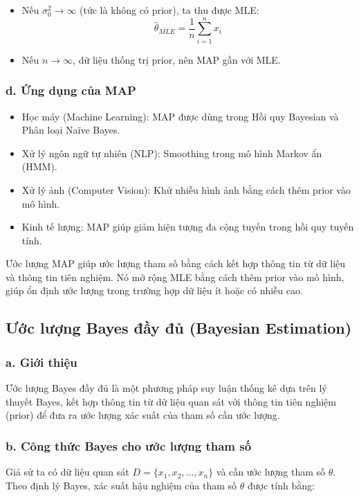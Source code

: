 \begin{itemize}
    \item Nếu $\sigma_0^2 \to \infty$ (tức là không có prior), ta thu được MLE:
    \begin{equation*}
        \hat{\theta}_{MLE} = \frac{1}{n} \sum_{i=1}^{n} x_i
    \end{equation*}
    \item Nếu $n \to \infty$, dữ liệu thống trị prior, nên MAP gần với MLE.
\end{itemize}


\subsubsection{d. Ứng dụng của MAP}
\begin{itemize}
    \item Học máy (Machine Learning): MAP được dùng trong Hồi quy Bayesian và Phân loại Naïve Bayes.
    \item Xử lý ngôn ngữ tự nhiên (NLP): Smoothing trong mô hình Markov ẩn (HMM).
    \item Xử lý ảnh (Computer Vision): Khử nhiễu hình ảnh bằng cách thêm prior vào mô hình.
    \item Kinh tế lượng: MAP giúp giảm hiện tượng đa cộng tuyến trong hồi quy tuyến tính.
\end{itemize}

Ước lượng MAP giúp ước lượng tham số bằng cách kết hợp thông tin từ dữ liệu và thông tin tiên nghiệm. Nó mở rộng MLE bằng cách thêm prior vào mô hình, giúp ổn định ước lượng trong trường hợp dữ liệu ít hoặc có nhiễu cao.


\subsection{Ước lượng Bayes đầy đủ (Bayesian Estimation)}
\subsubsection{a. Giới thiệu}
Ước lượng Bayes đầy đủ là một phương pháp suy luận thống kê dựa trên lý thuyết Bayes, kết hợp thông tin từ dữ liệu quan sát với thông tin tiên nghiệm (prior) để đưa ra ước lượng xác suất của tham số cần ước lượng.

\subsubsection{b. Công thức Bayes cho ước lượng tham số}
Giả sử ta có dữ liệu quan sát $D = \{ x_1, x_2, \dots, x_n \}$ và cần ước lượng tham số $\theta$. Theo định lý Bayes, xác suất hậu nghiệm của tham số $\theta$ được tính bằng:

